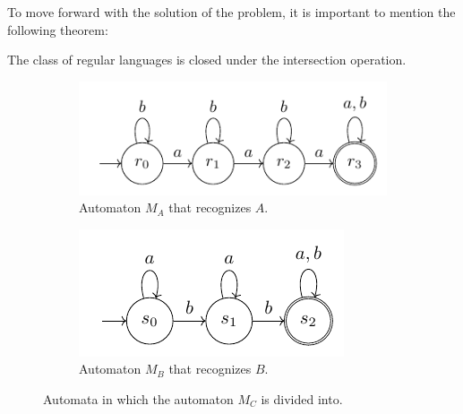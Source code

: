 \begin{solution}
    To move forward with the solution of the problem, it is important to mention the following theorem:
    \begin{theorem}
        The class of regular languages is closed under the intersection operation.
    \end{theorem}

    \begin{figure}[ht!]
        \centering
        \begin{subfigure}[b]{0.4\textwidth}
            \centering
            \includegraphics{automaton_a}
            \caption{Automaton $M_A$ that recognizes $A$.}
            \label{fig:automaton_a}
        \end{subfigure}
        \begin{subfigure}[b]{0.4\textwidth}
            \centering
            \includegraphics{automaton_b}
            \caption{Automaton $M_B$ that recognizes $B$.}
            \label{fig:automaton_b}
        \end{subfigure}
        \caption{Automata in which the automaton $M_C$ is divided into.}
    \end{figure}


\end{solution}
